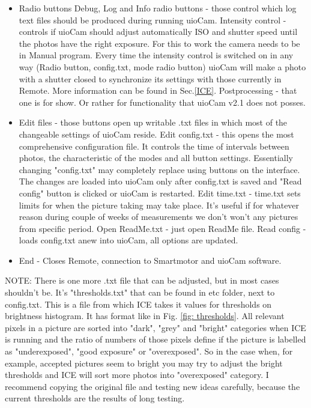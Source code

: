 \documentclass[]{book}
\begin{document}
\begin{itemize}
		\item Radio buttons
			\subitem Debug, Log and Info radio buttons - those control which log text files should be produced during running uioCam.
			\subitem Intensity control - controls if uioCam should adjust automatically ISO and shutter speed until the photos have the right exposure. For this to work the camera needs to be in Manual program. Every time the intensity control is switched on in any way (Radio button, config.txt, mode radio button) uioCam will make a photo with a shutter closed to synchronize its settings with those currently in Remote. More information can be found in Sec.\ref{ICE}.
			\subitem Postprocessing - that one is for show. Or rather for functionality that uioCam v2.1 does not posses.
		\item Edit files - those buttons open up writable .txt files in which most of the changeable settings of uioCam reside.
			\subitem Edit config.txt - this opens the most comprehensive configuration file. It controls the time of intervals between photos, the characteristic of the modes and all button settings. Essentially changing "config.txt" may completely replace using buttons on the interface. The changes are loaded into uioCam only after config.txt is saved and "Read config" button is clicked or uioCam is restarted.
			\subitem Edit time.txt - time.txt sets limits for when the picture taking may take place. It's useful if for whatever reason during couple of weeks of measurements we don't won't any pictures from specific period.
			\subitem Open ReadMe.txt - just open ReadMe file.
			\subitem Read config - loads config.txt anew into uioCam, all options are updated.
		\item End - Closes Remote, connection to Smartmotor and uioCam software.
	\end{itemize}

	NOTE: There is one more .txt file that can be adjusted, but in most cases shouldn't be. It's "thresholds.txt" that can be found in etc folder, next to config.txt. This is a file from which ICE takes it values for thresholds on brightness histogram. It has format like in Fig. \ref{fig: thresholds}. All relevant pixels in a picture are sorted into "dark", "grey" and "bright" categories when ICE is running and the ratio of numbers of those pixels define if the picture is labelled as "underexposed", "good exposure" or "overexposed". So in the case when, for example, accepted pictures seem to bright you may try to adjust the bright thresholds and ICE will sort more photos into "overexposed" category. I recommend copying the original file and testing new ideas carefully, because the current thresholds are the results of long testing.
	
\end{document}
